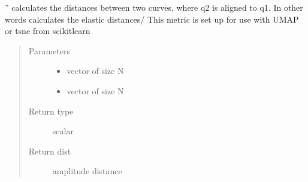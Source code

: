 \documentclass[letterpaper,10pt,english]{sphinxmanual}
\begin{document}
\begin{fulllineitems}
\label{\detokenize{umap_metric:umap_metric.efda_distance}}
”
calculates the distances between two curves, where 
q2 is aligned to q1. In other words calculates the elastic distances/
This metric is set up for use with UMAP or t\sphinxhyphen{}sne from scikit\sphinxhyphen{}learn
\begin{quote}\begin{description}
\item[{Parameters}] \leavevmode\begin{itemize}
\item {} 
 \textendash{} vector of size N

\item {} 
 \textendash{} vector of size N

\end{itemize}

\item[{Return type}] \leavevmode
scalar

\item[{Return dist}] \leavevmode
amplitude distance

\end{description}\end{quote}

\end{fulllineitems}

\end{document}
